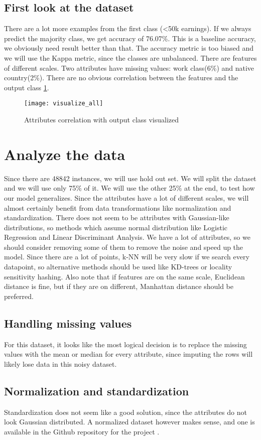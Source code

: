 \section{First look at the dataset}
There are a lot more examples from the first class (<50k earnings). If we always predict the majority class, we get accuracy of 76.07\%. This is a baseline accuracy, we obviously need result better than that. The accuracy metric is too biased and we will use the Kappa metric, since the classes are unbalanced. There are features of different scales. Two attributes have missing values: work class(6\%) and native country(2\%). There are no obvious correlation between the features and the output class \ref{fig:visual}.
\begin{figure}
    \centering
    \texttt{[image: visualize\_all]}
    \caption{Attributes correlation with output class visualized}
    \label{fig:visual}
\end{figure}

\chapter{Analyze the data}
Since there are 48842 instances, we will use hold out set. We will split the dataset and we will use only 75\% of it. We will use the other 25\% at the end, to test how our model generalizes. Since the attributes have a lot of different scales, we will almost certainly benefit from data transformations like normalization and standardization. There does not seem to be attributes with Gaussian-like distributions, so methods which assume normal distribution like Logistic Regression and Linear Discriminant Analysis. We have a lot of attributes, so we should consider removing some of them to remove the noise and speed up the model. Since there are a lot of points, k-NN will be very slow if we search every datapoint, so alternative methods should be used like KD-trees or locality sensitivity hashing. Also note that if features are on the same scale, Euclidean distance is fine, but if they are on different, Manhattan distance should be preferred.
\section{Handling missing values}
For this dataset, it looks like the most logical decision is to replace the missing values with the mean or median for every attribute, since imputing the rows will likely lose data in this noisy dataset.
\section{Normalization and standardization}
Standardization does not seem like a good solution, since the attributes do not look Gaussian distributed. A normalized dataset however makes sense, and one is available in the Github repository for the project \cite{repo}.

